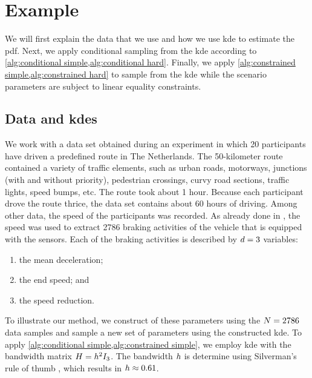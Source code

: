 \section{Example}
\label{sec:example}

We will first explain the data that we use and how we use \ac{kde} to estimate the \ac{pdf}.
Next, we apply conditional sampling from the \ac{kde} according to \cref{alg:conditional simple,alg:conditional hard}.
Finally, we apply \cref{alg:constrained simple,alg:constrained hard} to sample from the \ac{kde} while the scenario parameters are subject to linear equality constraints.



\subsection{Data and \acp{kde}}
\label{sec:example data}

\cstarta We work with a data set obtained during an experiment in which 20 participants have driven a predefined route in The Netherlands.
The 50-kilometer route contained a variety of traffic elements, such as urban roads, motorways, junctions (with and without priority), pedestrian crossings, curvy road sections, traffic lights, speed bumps, etc.
The route took about 1 hour.
Because each participant drove the route thrice, the data set contains about 60 hours of driving.
Among other data, the speed of the participants was recorded.
As already done in \autocite{deGelder2017assessment, degelder2019completeness}, the speed was used to extract 2786 braking activities of the vehicle that is equipped with the sensors. \cenda
Each of the braking activities is described by $d=3$ variables:
\begin{enumerate}
	\item the mean deceleration;
	\item the end speed; and
	\item the speed reduction.
\end{enumerate}

\cstarta To illustrate our method, we construct  of these parameters using the $N=2786$ data samples and sample a new set of parameters using the constructed \ac{kde}. \cenda
To apply \cref{alg:conditional simple,alg:constrained simple}, we employ \ac{kde} with the bandwidth matrix $H=h^2I_{3}$. 
\cstarta The bandwidth $h$ is determine using Silverman's rule of thumb \autocite{silverman1986density}, which results in $h\approx 0.61$. \cenda

